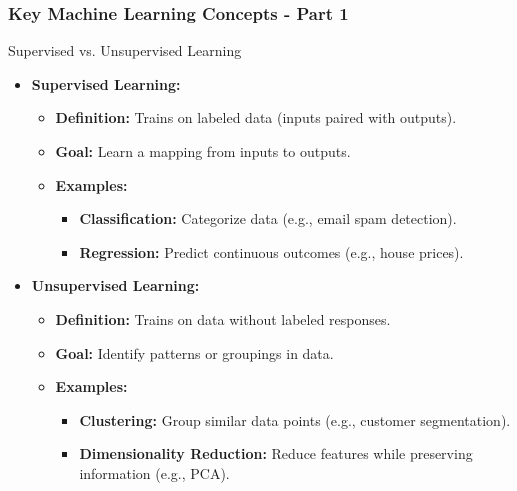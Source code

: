 \documentclass[aspectratio=169]{beamer}
\begin{document}
\begin{frame}[fragile]
    \frametitle{Key Machine Learning Concepts - Part 1}
    \begin{block}{Supervised vs. Unsupervised Learning}
        \begin{itemize}
            \item \textbf{Supervised Learning:}
                \begin{itemize}
                    \item \textbf{Definition:} Trains on labeled data (inputs paired with outputs).
                    \item \textbf{Goal:} Learn a mapping from inputs to outputs.
                    \item \textbf{Examples:}
                        \begin{itemize}
                            \item \textbf{Classification:} Categorize data (e.g., email spam detection).
                            \item \textbf{Regression:} Predict continuous outcomes (e.g., house prices).
                        \end{itemize}
                \end{itemize}
            \item \textbf{Unsupervised Learning:}
                \begin{itemize}
                    \item \textbf{Definition:} Trains on data without labeled responses.
                    \item \textbf{Goal:} Identify patterns or groupings in data.
                    \item \textbf{Examples:}
                        \begin{itemize}
                            \item \textbf{Clustering:} Group similar data points (e.g., customer segmentation).
                            \item \textbf{Dimensionality Reduction:} Reduce features while preserving information (e.g., PCA).
                        \end{itemize}
                \end{itemize}
        \end{itemize}
    \end{block}
\end{frame}
\end{document}
